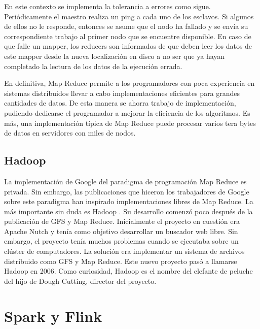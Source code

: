 \documentclass[10pt]{article}
\begin{document}
		En este contexto se implementa la tolerancia a errores como sigue. Periódicamente el maestro realiza un ping a cada uno de los esclavos. Si algunos de ellos no le responde, entonces se asume que el nodo ha fallado y se envía su correspondiente trabajo al primer nodo que se encuentre disponible. En caso de que falle un mapper, los reducers son informados de que deben leer los datos de este mapper desde la nueva localización en disco a no ser que ya hayan completado la lectura de los datos de la ejecución errada.

		En definitiva, Map Reduce permite a los programadores con poca experiencia en sistemas distribuidos llevar a cabo implementaciones eficientes para grandes cantidades de datos. De esta manera se ahorra trabajo de implementación, pudiendo dedicarse el programador a mejorar la eficiencia de los algoritmos. Es más, una implementación típica de Map Reduce puede procesar varios tera bytes de datos en servidores con miles de nodos.


	\subsection{Hadoop} \label{sec:mr-hadoop:hadoop}

		La implementación de Google del paradigma de programación Map Reduce es privada. Sin embargo, las publicaciones que hiceron los trabajadores de Google sobre este paradigma han inspirado implementaciones libres de Map Reduce. La más importante sin duda es Hadoop \cite{hadoop-book}. Su desarrollo comenzó poco después de la publicación de GFS y Map Reduce. Inicialmente el proyecto en cuestión era Apache Nutch \cite{nutch} y tenía como objetivo desarrollar un buscador web libre. Sin embargo, el proyecto tenía muchos problemas cuando se ejecutaba sobre un clúster de computadores. La solución era implementar un sistema de archivos distribuido como GFS y Map Reduce. Este nuevo proyecto pasó a llamarse Hadoop en 2006. Como curiosidad, Hadoop es el nombre del elefante de peluche del hijo de Dough Cutting, director del proyecto.


\section{Spark y Flink} \label{sec:spark-flink}
\end{document}
